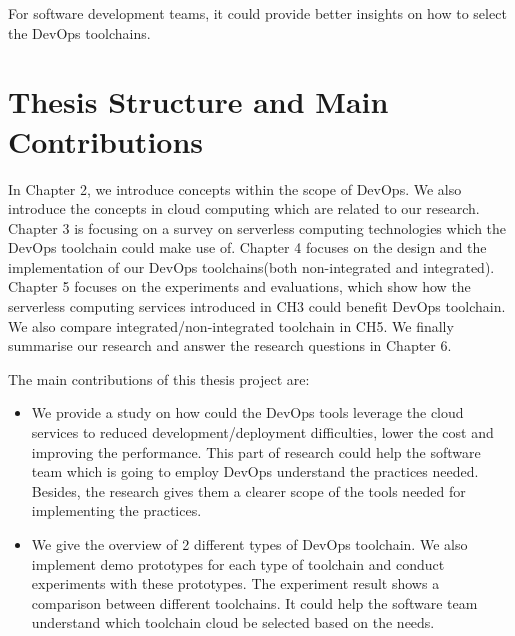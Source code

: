 For software development teams, it could provide better insights on how to select the DevOps toolchains.
\section{Thesis Structure and Main Contributions}
In Chapter 2, we introduce concepts within the scope of DevOps. We also introduce the concepts in cloud computing which are related to our research. Chapter 3 is focusing on a survey on serverless computing technologies which the DevOps toolchain could make use of. Chapter 4 focuses on the design and the implementation of our DevOps toolchains(both non-integrated and integrated). Chapter 5 focuses on the experiments and evaluations, which show how the serverless computing services introduced in CH3 could benefit DevOps toolchain. We also compare integrated/non-integrated toolchain in CH5. We finally summarise our research and answer the research questions in Chapter 6.
\par
The main contributions of this thesis project are:
\begin{itemize}
    \item We provide a study on how could the DevOps tools leverage the cloud services to reduced development/deployment difficulties, lower the cost and improving the performance. This part of research could help the software team which is going to employ DevOps understand the practices needed. Besides, the research gives them a clearer scope of the tools needed for implementing the practices.
    \item We give the overview of 2 different types of DevOps toolchain. We also implement demo prototypes for each type of toolchain and conduct experiments with these prototypes. The experiment result shows a comparison between different toolchains. It could help the software team understand which toolchain cloud be selected based on the needs.
\end{itemize}